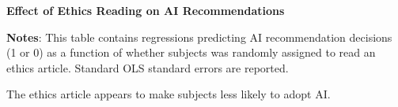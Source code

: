 \documentclass[11pt]{article}
\begin{document}
\begin{table}[htbp]
\caption{\textbf{Effect of Ethics Reading on AI Recommendations}
\label{tab:EngApproach}}
\flushleft
	
    \flushleft
    \begin{footnotesize}
    \textbf{Notes}: This table contains regressions predicting AI recommendation decisions (1 or 0) as a function of whether subjects was randomly assigned to read an ethics article. Standard OLS standard errors are reported.  
    \end{footnotesize}
\end{table}

The ethics article appears to make subjects less likely to adopt AI. 
\end{document}
